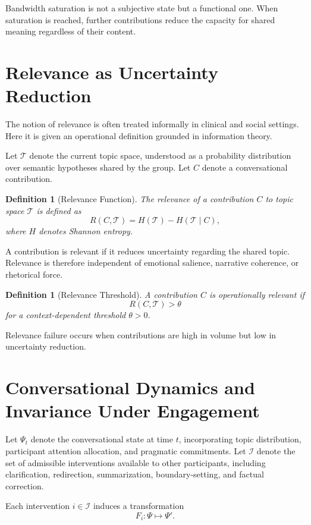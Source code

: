 \documentclass[12pt]{article}
\newtheorem{definition}[theorem]{Definition}
\theoremstyle{remark}
\begin{document}
Bandwidth saturation is not a subjective state but a functional one. When saturation is reached, further contributions reduce the capacity for shared meaning regardless of their content.

\section{Relevance as Uncertainty Reduction}

The notion of relevance is often treated informally in clinical and social settings. Here it is given an operational definition grounded in information theory.

Let $\mathcal{T}$ denote the current topic space, understood as a probability distribution over semantic hypotheses shared by the group. Let $C$ denote a conversational contribution.

\begin{definition}[Relevance Function]
The relevance of a contribution $C$ to topic space $\mathcal{T}$ is defined as
\[
R(C,\mathcal{T}) = H(\mathcal{T}) - H(\mathcal{T} \mid C),
\]
where $H$ denotes Shannon entropy.
\end{definition}

A contribution is relevant if it reduces uncertainty regarding the shared topic. Relevance is therefore independent of emotional salience, narrative coherence, or rhetorical force.

\begin{definition}[Relevance Threshold]
A contribution $C$ is operationally relevant if
\[
R(C,\mathcal{T}) > \theta
\]
for a context-dependent threshold $\theta > 0$.
\end{definition}

Relevance failure occurs when contributions are high in volume but low in uncertainty reduction.

\section{Conversational Dynamics and Invariance Under Engagement}

Let $\Psi_t$ denote the conversational state at time $t$, incorporating topic distribution, participant attention allocation, and pragmatic commitments. Let $\mathcal{I}$ denote the set of admissible interventions available to other participants, including clarification, redirection, summarization, boundary-setting, and factual correction.

Each intervention $i \in \mathcal{I}$ induces a transformation
\[
F_i : \Psi \mapsto \Psi'.
\]
\end{document}
